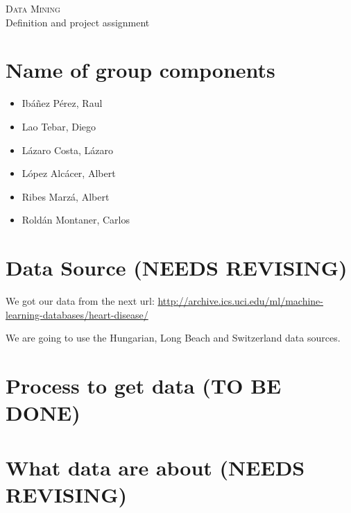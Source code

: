 \documentclass[a4paper,12pt]{article}
\begin{document}
\begin{center}
    \huge{\textsc{Data Mining} \\ Definition and project assignment}
\end{center}


% 

\section{Name of group components}

    \begin{itemize}
    
        \item Ibáñez Pérez, Raul
        \item Lao Tebar, Diego
        \item Lázaro Costa, Lázaro
        \item López Alcácer, Albert
        \item Ribes Marzá, Albert
        \item Roldán Montaner, Carlos
        
    \end{itemize}

\section{Data Source (\textbf{NEEDS REVISING})}
    
    We got our data from the next url: \url{http://archive.ics.uci.edu/ml/machine-learning-databases/heart-disease/} \newline
    
    We are going to use the Hungarian, Long Beach and Switzerland data sources.

\section{Process to get data (\textbf{TO BE DONE})}



\section{What data are about (\textbf{NEEDS REVISING})} 
\end{document}
